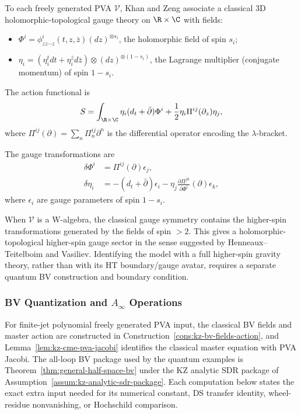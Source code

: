 \begin{construction}
\label{const:3d-poisson-sigma}
To each freely generated PVA $\mathcal{V}$, Khan and Zeng associate a classical 3D holomorphic-topological gauge theory on $\R \times \C$ with fields:
\begin{itemize}
\item $\Phi^i = \phi^i_{zz\cdots z}(t,z,\bar{z})(dz)^{\otimes s_i}$, the holomorphic field of spin $s_i$;
\item $\eta_i = (\eta_i^t dt + \eta_i^{\bar{z}} d\bar{z}) \otimes (dz)^{\otimes(1-s_i)}$, the Lagrange multiplier (conjugate momentum) of spin $1-s_i$.
\end{itemize}
The action functional is
\begin{equation}
\label{eq:KZ-action}
S = \int_{\R \times \C} \eta_i (d_t + \bar{\partial})\Phi^i + \frac{1}{2} \eta_i \Pi^{ij}(\partial_z) \eta_j,
\end{equation}
where $\Pi^{ij}(\partial) = \sum_n \Pi^{ij}_n \partial^n$ is the differential operator encoding the $\lambda$-bracket.

The gauge transformations are
\begin{align}
\delta \Phi^i &= \Pi^{ij}(\partial) \epsilon_j,\\
\delta \eta_i &= -(d_t + \bar{\partial})\epsilon_i - \eta_j \frac{\partial \Pi^{jk}}{\partial \Phi^i}(\partial) \epsilon_k,
\end{align}
where $\epsilon_i$ are gauge parameters of spin $1-s_i$.
\end{construction}

\begin{remark}
When $\mathcal{V}$ is a W-algebra, the classical gauge symmetry contains the higher-spin transformations generated by the fields of spin $>2$. This gives a holomorphic-topological higher-spin gauge sector in the sense suggested by Henneaux--Teitelboim and Vasiliev. Identifying the model with a full higher-spin gravity theory, rather than with its HT boundary/gauge avatar, requires a separate quantum BV construction and boundary condition.
\end{remark}

\subsubsection{BV Quantization and $A_\infty$ Operations}

\begin{remark}
\label{rem:W-hypotheses}
For finite-jet polynomial freely generated PVA input, the classical BV
fields and master action are constructed in
Construction~\ref{cons:kz-bv-fields-action}, and
Lemma~\ref{lem:kz-cme-pva-jacobi} identifies the classical master
equation with PVA Jacobi. The all-loop BV package used by the quantum
examples is Theorem~\ref{thm:general-half-space-bv} under the KZ
analytic SDR package of Assumption~\ref{assum:kz-analytic-sdr-package}.
Each computation below states the exact extra input needed for its
numerical constant, DS transfer identity, wheel-residue nonvanishing,
or Hochschild comparison.
\end{remark}

